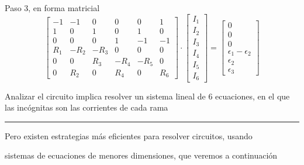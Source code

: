\documentclass[aspectratio=169, xcolor={usenames,svgnames,dvipsnames}]{beamer}
\begin{document}
\begin{frame}{Paso 3, en forma matricial}
    \vspace{4mm}
    \begin{equation*}
      \begin{bmatrix}
        -1 & -1 & 0 & 0 & 0 & 1\\
        1 & 0 & 1 & 0 & 1 & 0\\
        0 & 0 & 0 & 1 & -1 & -1\\
        R_1 & -R_2 & - R_3 & 0 & 0 & 0\\
        0 & 0 & R_3 & - R_4 & - R_5 & 0\\
        0 & R_2 & 0 & R_4 & 0 & R_6
      \end{bmatrix} \cdot %
      \begin{bmatrix}
        I_1\\
        I_2\\
        I_3\\
        I_4\\
        I_5\\
        I_6    
      \end{bmatrix} = %
      \begin{bmatrix}
        0\\
        0\\
        0\\
        \epsilon_1 - \epsilon_2\\
        \epsilon_2\\
        \epsilon_3
      \end{bmatrix}
    \end{equation*}

    \vspace{2mm}
    \begin{center}
        \begin{minipage}{0.8\linewidth} 
            \begin{center}
                Analizar el circuito implica resolver un sistema lineal de \alert{6 ecuaciones}, en el que las incógnitas son las corrientes de cada rama
            \end{center} 
        \end{minipage}
        
        \vspace{2mm}
    
        \noindent\rule{\textwidth}{0.5pt}
    
        \vspace{4mm}

        \begin{minipage}{0.8\linewidth} 
            \begin{center}
                \small{Pero existen estrategias más eficientes para resolver circuitos, usando 
                
                sistemas de ecuaciones de menores dimensiones, que veremos a continuación}
            \end{center} 
        \end{minipage}
    \end{center}    
\end{frame}
\end{document}
